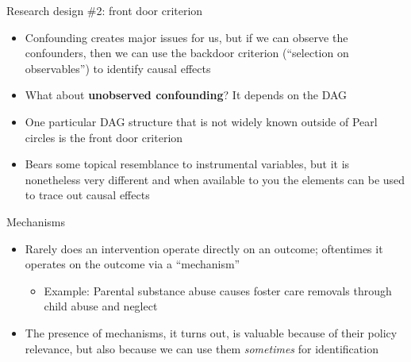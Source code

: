 \documentclass{beamer}
\begin{document}
\begin{frame}{Research design \#2: front door criterion}

  \begin{itemize}
    \item Confounding creates major issues for us, but if we can observe the confounders, then we can use the backdoor criterion (``selection on observables'') to identify causal effects
    \item What about \textbf{unobserved confounding}?  It depends on the DAG
    \item One particular DAG structure that is not widely known outside of Pearl circles is the front door criterion
    \item Bears some topical resemblance to instrumental variables, but it is nonetheless very different and when available to you the elements can be used to trace out causal effects
  \end{itemize}

\end{frame}

\begin{frame}{Mechanisms}

  \begin{itemize}
    \item Rarely does an intervention operate directly on an outcome; oftentimes it operates on the outcome via a ``mechanism''
          \begin{itemize}
            \item Example: Parental substance abuse causes foster care removals through child abuse and neglect
          \end{itemize}
    \item The presence of mechanisms, it turns out, is valuable because of their policy relevance, but also because we can use them \emph{sometimes} for identification
  \end{itemize}

\end{frame}
\end{document}
